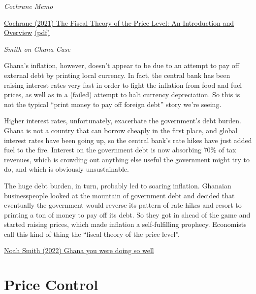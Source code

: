 \documentclass[
]{book}
\begin{document}
\emph{Cochrane Memo}

\href{https://www.johnhcochrane.com/research-all/the-fiscal-theory-of-the-price-level-1}{Cochrane (2021) The Fiscal Theory of the Price Level: An Introduction and Overview}
\href{pdf/Cochrane_2021_Fiscal_Theory_of_Price_Level.pdf}{(pdf)}

\emph{Smith on Ghana Case}

Ghana's inflation, however, doesn't appear to be due to an attempt to pay off external debt by printing local currency. In fact, the central bank has been raising interest rates very fast in order to fight the inflation from food and fuel prices, as well as in a (failed) attempt to halt currency depreciation. So this is not the typical ``print money to pay off foreign debt'' story we're seeing.

Higher interest rates, unfortunately, exacerbate the government's debt burden. Ghana is not a country that can borrow cheaply in the first place, and global interest rates have been going up, so the central bank's rate hikes have just added fuel to the fire. Interest on the government debt is now absorbing 70\% of tax revenues, which is crowding out anything else useful the government might try to do, and which is obviously unsustainable.

The huge debt burden, in turn, probably led to soaring inflation. Ghanaian businesspeople looked at the mountain of government debt and decided that eventually the government would reverse its pattern of rate hikes and resort to printing a ton of money to pay off its debt. So they got in ahead of the game and started raising prices, which made inflation a self-fulfilling prophecy. Economists call this kind of thing the ``fiscal theory of the price level''.

\href{https://noahpinion.substack.com/p/ghana-you-were-doing-so-well}{Noah Smith (2022) Ghana you were doing so well}

\hypertarget{price-control}{%
\section{Price Control}\label{price-control}}
\end{document}
